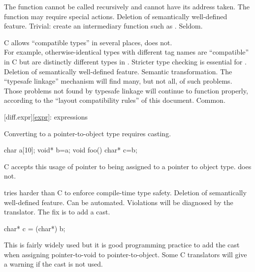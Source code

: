 \change
The  function cannot be called recursively and cannot have its address taken.
\rationale
The  function may require special actions.
\effect
Deletion of semantically well-defined feature.
\difficulty
Trivial: create an intermediary function such as
.
\howwide
Seldom.

\change
C allows ``compatible types'' in several places, \Cpp{} does not.\\
For example,
otherwise-identical  types with different tag names
are ``compatible'' in C but are distinctly different types
in \Cpp{}.
\rationale
Stricter type checking is essential for \Cpp{}.
\effect
Deletion of semantically well-defined feature.
\difficulty
Semantic transformation.
The ``typesafe linkage'' mechanism will find many, but not all,
of such problems.
Those problems not found by typesafe linkage will continue to
function properly,
according to the ``layout compatibility rules'' of this
document.
\howwide
Common.

[diff.expr]{\ref{expr}: expressions}

\change
Converting  to a pointer-to-object type requires casting.
\begin{example}
\begin{codeblock}
char a[10];
void* b=a;
void foo() {
  char* c=b;
}
\end{codeblock}

C accepts this usage of pointer to  being assigned
to a pointer to object type.
\Cpp{} does not.
\end{example}
\rationale
\Cpp{} tries harder than C to enforce compile-time type safety.
\effect
Deletion of semantically well-defined feature.
\difficulty
Can be automated.
Violations will be diagnosed by the \Cpp{} translator.
The fix is to add a  cast.
\begin{example}
\begin{codeblock}
char* c = (char*) b;
\end{codeblock}
\end{example}

\howwide
This is fairly widely used but it is good
programming practice to add the cast when assigning pointer-to-void to pointer-to-object.
Some C translators will give a warning
if the cast is not used.

